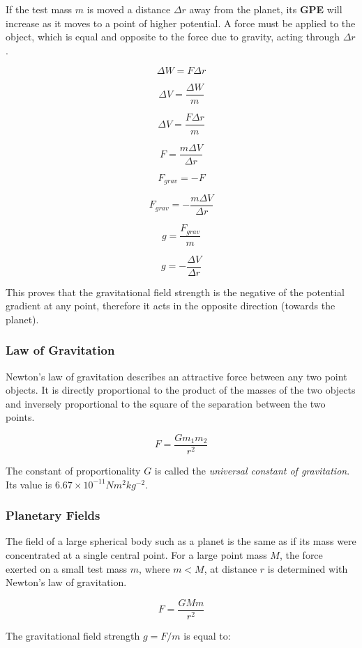 \documentclass[12pt]{article}
\begin{document}
If the test mass \(m\) is moved a distance \(\Delta r\) away from the planet, its \textbf{GPE} will increase as it moves to a point of higher potential. A force must be applied to the object, which is equal and opposite to the force due to gravity, acting through \(\Delta r\).

\[\Delta W = F \Delta r\]

\[\Delta V = \dfrac{\Delta W}{m}\]

\[\Delta V = \dfrac{F \Delta r}{m}\]

\[F = \dfrac{m \Delta V}{\Delta r}\]

\[F_{grav} = -F\]

\[F_{grav} = - \dfrac{m \Delta V}{\Delta r}\]

\[g = \dfrac{F_{grav}}{m}\]

\[g = - \dfrac{\Delta V}{\Delta r}\]

This proves that the gravitational field strength is the negative of the potential gradient at any point, therefore it acts in the opposite direction (towards the planet).

\subsubsection{Law of Gravitation}
\label{sec:org77f2cf0}

Newton's law of gravitation describes an attractive force between any two point objects. It is directly proportional to the product of the masses of the two objects and inversely proportional to the square of the separation between the two points.

\[F = \dfrac{Gm_1m_2}{r^2}\]

The constant of proportionality \(G\) is called the \emph{universal constant of gravitation}. Its value is \(6.67 \times 10^{-11} \text{} Nm^2kg^{-2}\).

\subsubsection{Planetary Fields}
\label{sec:orgbd1271f}

The field of a large spherical body such as a planet is the same as if its mass were concentrated at a single central point. For a large point mass \(M\), the force exerted on a small test mass \(m\), where \(m < M\), at distance \(r\) is determined with Newton's law of gravitation.

\[F = \dfrac{GMm}{r^2}\]

The gravitational field strength \(g = F / m\) is equal to:
\end{document}
